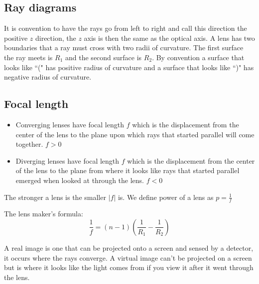 \subsection*{Ray diagrams}

It is convention to have the rays go from left to right and call this direction the positive \(z\) direction, the \(z\) axis is then the same as the optical axis. A lens has two boundaries that a ray must cross with two radii of curvature. The first surface the ray meets is \(R_1\) and the second surface is \(R_2\). By convention a surface that looks like ``(" has positive radius of curvature and a surface that looks like ``)" has negative radius of curvature.

\subsection*{Focal length}

\begin{itemize}
\item Converging lenses have focal length \(f\) which is the displacement from the center of the lens to the plane upon which rays that started parallel will come together. \(f>0\)
\item Diverging lenses have focal length \(f\) which is the displacement from the center of the lens to the plane from where it looks like rays that started parallel emerged when looked at through the lens. \(f<0\)
\end{itemize}

The stronger a lens is the smaller \(|f|\) is. We define power of a lens as \(p=\frac 1f\)

The lens maker's formula:
\[\frac 1f=(n-1)\left(\frac{1}{R_1}-\frac{1}{R_2}\right)\]

A real image is one that can be projected onto a screen and sensed by a detector, it occurs where the rays converge. A virtual image can't be projected on a screen but is where it looks like the light comes from if you view it after it went through the lens.

\begin{center}
\end{center}

